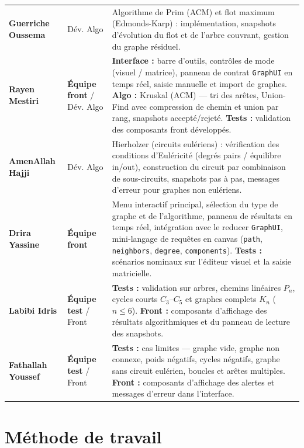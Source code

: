 \documentclass[a4paper,12pt]{report}
\begin{document}
\begin{longtable}{>{\bfseries}p{3.6cm} p{2.8cm} p{7.2cm}}
Guerriche Oussema & Dév. Algo &
Algorithme de Prim (ACM) et flot maximum (Edmonds-Karp) : implémentation, snapshots d'évolution du flot et de l'arbre couvrant, gestion du graphe résiduel. \\

\rowcolor{teal100}
Rayen Mestiri & \textbf{Équipe front} / Dév. Algo &
\textbf{Interface :} barre d'outils, contrôles de mode (visuel / matrice), panneau de contrat \texttt{GraphUI} en temps réel, saisie manuelle et import de graphes. \textbf{Algo :} Kruskal (ACM) — tri des arêtes, Union-Find avec compression de chemin et union par rang, snapshots accepté/rejeté. \textbf{Tests :} validation des composants front développés. \\

AmenAllah Hajji & Dév. Algo &
Hierholzer (circuits eulériens) : vérification des conditions d'Euléricité (degrés pairs / équilibre in/out), construction du circuit par combinaison de sous-circuits, snapshots pas à pas, messages d'erreur pour graphes non eulériens. \\

\rowcolor{teal100}
Drira Yassine & \textbf{Équipe front} &
Menu interactif principal, sélection du type de graphe et de l'algorithme, panneau de résultats en temps réel, intégration avec le reducer \texttt{GraphUI}, mini-langage de requêtes en canvas (\texttt{path}, \texttt{neighbors}, \texttt{degree}, \texttt{components}). \textbf{Tests :} scénarios nominaux sur l'éditeur visuel et la saisie matricielle. \\

Labibi Idris & \textbf{Équipe test} / Front &
\textbf{Tests :} validation sur arbres, chemins linéaires $P_n$, cycles courts $C_3$--$C_5$ et graphes complets $K_n$ ($n \leq 6$). \textbf{Front :} composants d'affichage des résultats algorithmiques et du panneau de lecture des snapshots. \\

\rowcolor{teal100}
Fathallah Youssef & \textbf{Équipe test} / Front &
\textbf{Tests :} cas limites — graphe vide, graphe non connexe, poids négatifs, cycles négatifs, graphe sans circuit eulérien, boucles et arêtes multiples. \textbf{Front :} composants d'affichage des alertes et messages d'erreur dans l'interface. \\

\end{longtable}

\section{Méthode de travail}
\end{document}
